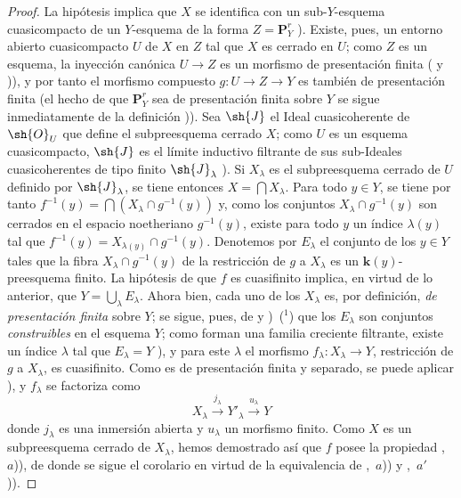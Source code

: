 \begin{proof}
La hipótesis implica que $X$ se identifica con un sub-$Y$-esquema cuasicompacto de un $Y$-esquema de la forma $Z=\mathbf{P}^r_Y$ ).
Existe, pues, un entorno abierto cuasicompacto $U$ de $X$ en $Z$ tal que $X$ es cerrado en $U$; como $Z$ es un esquema, la inyección canónica $U\to Z$ es un morfismo de presentación finita ( y )), y por tanto el morfismo compuesto $g:U\to Z\to Y$ es también de presentación finita (el hecho de que $\mathbf{P}^r_Y$ sea de presentación finita sobre $Y$ se sigue inmediatamente de la definición )).
Sea $\sh{J}$ el Ideal cuasicoherente de $\sh{O}_U$ que define el subpreesquema cerrado $X$; como $U$ es un esquema cuasicompacto, $\sh{J}$ es el límite inductivo filtrante de sus sub-Ideales cuasicoherentes de tipo finito $\sh{J}_\lambda$ ).
Si $X_\lambda$ es el subpreesquema cerrado de $U$ definido por $\sh{J}_\lambda$, se tiene entonces $X=\bigcap X_\lambda$.
Para todo $y\in Y$, se tiene por tanto $f^{-1}(y)=\bigcap(X_\lambda\cap g^{-1}(y))$ y, como los conjuntos $X_\lambda\cap g^{-1}(y)$ son cerrados en el espacio noetheriano $g^{-1}(y)$, existe para todo $y$ un índice $\lambda(y)$ tal que $f^{-1}(y)=X_{\lambda(y)}\cap g^{-1}(y)$.
Denotemos por $E_\lambda$ el conjunto de los $y\in Y$ tales que la fibra $X_\lambda\cap g^{-1}(y)$ de la restricción de $g$ a $X_\lambda$ es un $\boldsymbol k(y)$-preesquema finito.
La hipótesis de que $f$ es cuasifinito implica, en virtud de lo anterior, que $Y=\bigcup_\lambda E_\lambda$.
Ahora bien, cada uno de los $X_\lambda$ es, por definición, \emph{de presentación finita} sobre $Y$; se sigue, pues, de  y )~($^1$) que los $E_\lambda$ son conjuntos \emph{construibles} en el esquema $Y$; como forman una familia creciente filtrante, existe un índice $\lambda$ tal que $E_\lambda=Y$ ), y para este $\lambda$ el morfismo $f_\lambda:X_\lambda\to Y$, restricción de $g$ a $X_\lambda$, es cuasifinito. Como es de presentación finita y separado, se puede aplicar ), y $f_\lambda$ se factoriza como
\[
X_\lambda\xrightarrow{j_\lambda}Y'_\lambda\xrightarrow{u_\lambda}Y
\]
donde $j_\lambda$ es una inmersión abierta y $u_\lambda$ un morfismo finito.
Como $X$ es un subpreesquema cerrado de $X_\lambda$, hemos demostrado así que $f$ posee la propiedad ,~$a$)), de donde se sigue el corolario en virtud de la equivalencia de ,~$a$)) y ,~$a'$)).
\end{proof}

